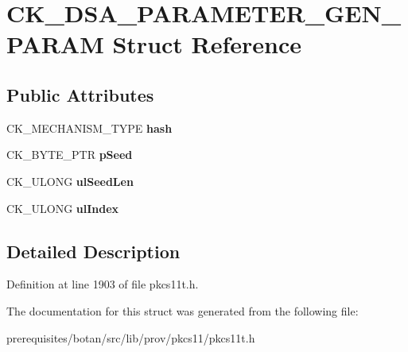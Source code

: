 \hypertarget{struct_c_k___d_s_a___p_a_r_a_m_e_t_e_r___g_e_n___p_a_r_a_m}{}\section{C\+K\+\_\+\+D\+S\+A\+\_\+\+P\+A\+R\+A\+M\+E\+T\+E\+R\+\_\+\+G\+E\+N\+\_\+\+P\+A\+R\+AM Struct Reference}
\label{struct_c_k___d_s_a___p_a_r_a_m_e_t_e_r___g_e_n___p_a_r_a_m}
\subsection*{Public Attributes}
\begin{DoxyCompactItemize}
\item 
\mbox{\label{struct_c_k___d_s_a___p_a_r_a_m_e_t_e_r___g_e_n___p_a_r_a_m_afe6ab7148f543c481849e0ec34a5640d}} 
C\+K\+\_\+\+M\+E\+C\+H\+A\+N\+I\+S\+M\+\_\+\+T\+Y\+PE {\bfseries hash}
\item 
\mbox{\label{struct_c_k___d_s_a___p_a_r_a_m_e_t_e_r___g_e_n___p_a_r_a_m_a0b2bc38c8356e579a5aa6100cf3e81df}} 
C\+K\+\_\+\+B\+Y\+T\+E\+\_\+\+P\+TR {\bfseries p\+Seed}
\item 
\mbox{\label{struct_c_k___d_s_a___p_a_r_a_m_e_t_e_r___g_e_n___p_a_r_a_m_a101fd84998c7372253c82bb5c86441c4}} 
C\+K\+\_\+\+U\+L\+O\+NG {\bfseries ul\+Seed\+Len}
\item 
\mbox{\label{struct_c_k___d_s_a___p_a_r_a_m_e_t_e_r___g_e_n___p_a_r_a_m_af9a4d7597af2e0c9ec658123ccfdab3f}} 
C\+K\+\_\+\+U\+L\+O\+NG {\bfseries ul\+Index}
\end{DoxyCompactItemize}


\subsection{Detailed Description}


Definition at line 1903 of file pkcs11t.\+h.



The documentation for this struct was generated from the following file\+:\begin{DoxyCompactItemize}
\item 
prerequisites/botan/src/lib/prov/pkcs11/pkcs11t.\+h\end{DoxyCompactItemize}
